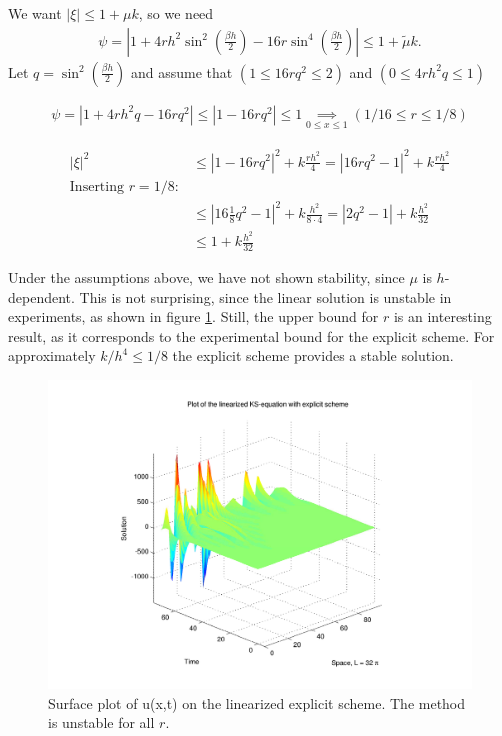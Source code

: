 We want $|\xi| \le 1+ \mu k$, so we need 
\begin{align*}
\psi = |1+4rh^2\sin^2\left(\frac{\beta h}{2}\right)-16r\sin^4\left(\frac{\beta h}{2}\right)| \le 1 + \tilde{\mu}k.
\end{align*}
Let $q = \sin^2\left(\frac{\beta h}{2}\right)$ and assume that $(1 \le 16rq^2 \le 2)$ and $(0 \le 4rh^2q \le 1)$


\begin{align*}
\psi = \left| 1+4rh^2q -16rq^2\right| \le \left| 1-16rq^2\right| \le 1 \underset{0\le x\le 1}{\implies} \left(1/16 \le r \le 1/8 \right)
\end{align*} 

\begin{align*}
|\xi |^2 &\le |1-16rq^2|^2 + k\frac{rh^2}{4} = |16rq^2-1|^2  + k\frac{rh^2}{4} \\
\textrm{Inserting } r = 1/8: \\
&\le |16\frac{1}{8}q^2-1|^2 + k\frac{h^2}{8\cdot 4} = |2q^2-1| + k\frac{h^2}{32} \\
&\le 1 + k\frac{h^2}{32}
\end{align*}

Under the assumptions above, we have not shown stability, since $\mu$ is $h$-dependent. This is not surprising, since the linear solution is unstable in experiments, as shown in figure \ref{fig:lin_exp}. Still, the upper bound for $r$ is an interesting result, as it corresponds to the experimental bound for the explicit scheme. For approximately $k/h^4 \le 1/8$ the explicit scheme provides a stable solution. 




\begin{figure}[H]
\centering
\includegraphics[scale=0.5]
{../PDFs/FE_Exp/linear_explicit.pdf}
\caption{Surface plot of u(x,t) on the linearized explicit scheme. The method is unstable for all $r$.}
\label{fig:lin_exp}
\end{figure}








